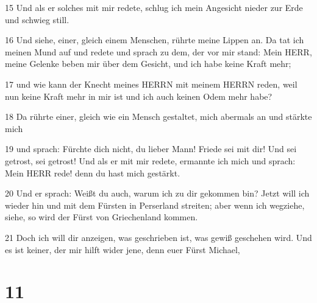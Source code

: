 \par 15 Und als er solches mit mir redete, schlug ich mein Angesicht nieder zur Erde und schwieg still.
\par 16 Und siehe, einer, gleich einem Menschen, rührte meine Lippen an. Da tat ich meinen Mund auf und redete und sprach zu dem, der vor mir stand: Mein HERR, meine Gelenke beben mir über dem Gesicht, und ich habe keine Kraft mehr;
\par 17 und wie kann der Knecht meines HERRN mit meinem HERRN reden, weil nun keine Kraft mehr in mir ist und ich auch keinen Odem mehr habe?
\par 18 Da rührte einer, gleich wie ein Mensch gestaltet, mich abermals an und stärkte mich
\par 19 und sprach: Fürchte dich nicht, du lieber Mann! Friede sei mit dir! Und sei getrost, sei getrost! Und als er mit mir redete, ermannte ich mich und sprach: Mein HERR rede! denn du hast mich gestärkt.
\par 20 Und er sprach: Weißt du auch, warum ich zu dir gekommen bin? Jetzt will ich wieder hin und mit dem Fürsten in Perserland streiten; aber wenn ich wegziehe, siehe, so wird der Fürst von Griechenland kommen.
\par 21 Doch ich will dir anzeigen, was geschrieben ist, was gewiß geschehen wird. Und es ist keiner, der mir hilft wider jene, denn euer Fürst Michael,

\chapter{11}

